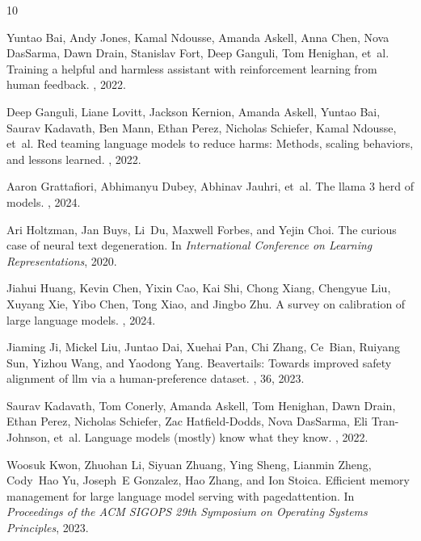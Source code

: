 \documentclass[11pt]{article}
\begin{document}
\begin{thebibliography}{10}

Yuntao Bai, Andy Jones, Kamal Ndousse, Amanda Askell, Anna Chen, Nova DasSarma,
  Dawn Drain, Stanislav Fort, Deep Ganguli, Tom Henighan, et~al.
\newblock Training a helpful and harmless assistant with reinforcement learning
  from human feedback.
, 2022.

Deep Ganguli, Liane Lovitt, Jackson Kernion, Amanda Askell, Yuntao Bai, Saurav
  Kadavath, Ben Mann, Ethan Perez, Nicholas Schiefer, Kamal Ndousse, et~al.
\newblock Red teaming language models to reduce harms: Methods, scaling
  behaviors, and lessons learned.
, 2022.

Aaron Grattafiori, Abhimanyu Dubey, Abhinav Jauhri, et~al.
\newblock The llama 3 herd of models.
, 2024.

Ari Holtzman, Jan Buys, Li~Du, Maxwell Forbes, and Yejin Choi.
\newblock The curious case of neural text degeneration.
\newblock In {\em International Conference on Learning Representations}, 2020.

Jiahui Huang, Kevin Chen, Yixin Cao, Kai Shi, Chong Xiang, Chengyue Liu, Xuyang
  Xie, Yibo Chen, Tong Xiao, and Jingbo Zhu.
\newblock A survey on calibration of large language models.
, 2024.

Jiaming Ji, Mickel Liu, Juntao Dai, Xuehai Pan, Chi Zhang, Ce~Bian, Ruiyang
  Sun, Yizhou Wang, and Yaodong Yang.
\newblock Beavertails: Towards improved safety alignment of llm via a
  human-preference dataset.
, 36, 2023.

Saurav Kadavath, Tom Conerly, Amanda Askell, Tom Henighan, Dawn Drain, Ethan
  Perez, Nicholas Schiefer, Zac Hatfield-Dodds, Nova DasSarma, Eli
  Tran-Johnson, et~al.
\newblock Language models (mostly) know what they know.
, 2022.

Woosuk Kwon, Zhuohan Li, Siyuan Zhuang, Ying Sheng, Lianmin Zheng, Cody~Hao Yu,
  Joseph~E Gonzalez, Hao Zhang, and Ion Stoica.
\newblock Efficient memory management for large language model serving with
  pagedattention.
\newblock In {\em Proceedings of the ACM SIGOPS 29th Symposium on Operating
  Systems Principles}, 2023.


\end{thebibliography}
\end{document}
